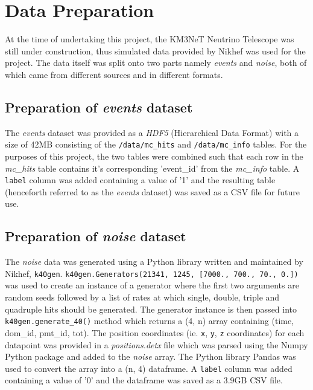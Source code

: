 
\chapter{Data Preparation} %
\label{cha:data-prep}


At the time of undertaking this project, the KM3NeT Neutrino Telescope was
still under construction, thus  simulated data provided by Nikhef was used for
the project. The data itself was split onto two parts namely \emph{events} and
\emph{noise}, both of which came from different sources and in different
formats.

\section{Preparation of \emph{events} dataset}%
\label{sec:data-prep-events}
The \emph{events} dataset was provided as a \emph{HDF5} (Hierarchical Data
Format) with a size of 42MB consisting of the \texttt{/data/mc\_hits} and
\texttt{/data/mc\_info} tables. For the purposes of this project, the two
tables were combined such that each row in the \textit{mc\_hits} table contains
it's corresponding 'event\_id' from the \textit{mc\_info}
table. A \texttt{label} column was added containing a value of '1' and the
resulting table (henceforth referred to as the \emph{events} dataset) was saved as
a CSV file for future use.

\section{Preparation of \emph{noise} dataset}%
\label{sec:data-prep-noise}
The \emph{noise} data was generated using a Python library written and
maintained by Nikhef, \texttt{k40gen}. \texttt{k40gen.Generators(21341, 1245,
[7000., 700., 70., 0.])} was used to create an instance of a generator where
the first two arguments are random seeds followed by a list of rates at which
single, double, triple and quadruple hits should be generated. The generator
instance is then passed into \texttt{k40gen.generate\_40()} method which
returns a (4, n) array containing (time, dom\_id, pmt\_id, tot). The position
coordinates (ie. \texttt{x}, \texttt{y}, \texttt{z} coordinates) for each
datapoint was provided in a \emph{positions.detx} file which was parsed using
the Numpy Python package \cite{numpy} and added to the \emph{noise} array. The
Python library Pandas \cite{pandas} was used to convert the array into a (n, 4)
dataframe. A \texttt{label} column was added containing a value of '0' and the
dataframe was saved as a 3.9GB CSV file.

